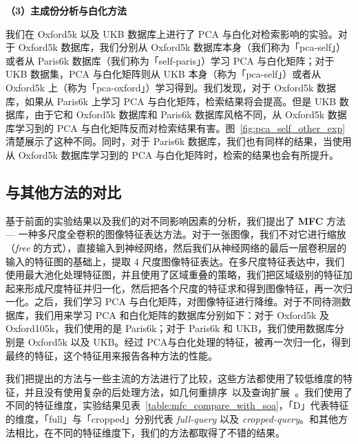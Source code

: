 \noindent\textbf{（3）主成份分析与白化方法}

我们在 Oxford5k 以及 UKB 数据库上进行了 PCA 与白化对检索影响的实验。对于 Oxford5k 数据库，我们分别从 Oxford5k 数据库本身（我们称为「pca-self」）或者从 Paris6k 数据库（我们称为「self-paris」）学习 PCA 与白化矩阵；对于 UKB 数据集，PCA 与白化矩阵则从 UKB 本身（称为「pca-self」）或者从 Oxford5k 上（称为「pca-oxford」）学习得到。我们发现，对于 Oxford5k 数据库，如果从 Paris6k 上学习 PCA 与白化矩阵，检索结果将会提高。但是 UKB 数据库，由于它和 Oxford5k 数据库和 Paris6k 数据库风格不同，从 Oxford5k 数据库学习到的 PCA 与白化矩阵反而对检索结果有害。图~\ref{fig:pca_self_other_exp}清楚展示了这种不同。同时，对于 Paris6k 数据库，我们也有同样的结果，当使用从 Oxford5k 数据库学习到的 PCA 与白化矩阵时，检索的结果也会有所提升。


\subsection{与其他方法的对比} \label{subsec:mfc_compare_soa}
基于前面的实验结果以及我们的对不同影响因素的分析，我们提出了 \textbf{MFC} 方法 --- 一种多尺度全卷积的图像特征表达方法。对于一张图像，我们不对它进行缩放（\emph{free} 的方式），直接输入到神经网络，然后我们从神经网络的最后一层卷积层的输入的特征图的基础上，提取 4 尺度图像特征表达。在多尺度特征表达中，我们使用最大池化处理特征图，并且使用了区域重叠的策略，我们把区域级别的特征加起来形成尺度特征并归一化，然后把各个尺度的特征求和得到图像特征，再一次归一化。之后，我们学习 PCA 与白化矩阵，对图像特征进行降维。对于不同待测数据库，我们用来学习 PCA 和白化矩阵的数据库分别如下：对于 Oxford5k 及 Oxford105k，我们使用的是 Paris6k；对于 Paris6k 和 UKB，我们使用数据库分别是 Oxford5k 以及 UKB。经过 PCA与白化处理的特征，被再一次归一化，得到最终的特征，这个特征用来报告各种方法的性能。

我们把提出的方法与一些主流的方法进行了比较，这些方法都使用了较低维度的特征，并且没有使用复杂的后处理方法，如几何重排序~\cite{Philbin2007ObjectRW}以及查询扩展~\cite{Chum2007TotalRA}。我们使用了不同的特征维度，实验结果见表~\ref{table:mfc_compare_with_soa}，「D」代表特征的维度，「full」与「cropped」分别代表 \emph{full-query} 以及 \emph{cropped-query}。和其他方法相比，在不同的特征维度下，我们的方法都取得了不错的结果。

